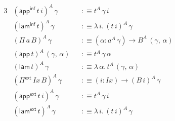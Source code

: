 \documentclass[12pt,a4paper,twoside,openany]{book}
\theoremstyle{remark}
\theoremstyle{definition}
\theoremstyle{theorem}
\newcommand{\mi}[1]{\mathit{#1}}
\newcommand{\ms}[1]{\mathsf{#1}}
\newcommand{\Pie}{\Pi^{\mathsf{ext}}}
\newcommand{\appe}{\mathsf{app^{ext}}}
\newcommand{\lame}{\mathsf{lam^{ext}}}
\newcommand{\appinf}{\mathsf{app^{inf}}}
\newcommand{\laminf}{\mathsf{lam^{inf}}}
\newcommand{\app}{\ms{app}}
\newcommand{\lam}{\ms{lam}}
\newcommand{\defn}{:\equiv}
\begin{document}
\begin{alignat*}{3}
  &(\appinf\,t\,i)^A\,\gamma &&\defn t^A\,\gamma\,i\\
  &(\laminf\,t)^A\,\gamma &&\defn \lambda\,i.\,(t\,i)^A\,\gamma\\
  &(\Pi\,a\,B)^A\,\gamma &&\defn (\alpha : a^A\,\gamma) \to B^A\,(\gamma,\,\alpha)\\
  &(\app\,t)^A\,(\gamma,\,\alpha) &&\defn t^A\,\gamma\,\alpha\\
  &(\lam\,t)^A\,\gamma &&\defn \lambda\,\alpha.\,t^A\,(\gamma,\,\alpha)\\
  &(\Pie\,\mi{Ix}\,B)^A\,\gamma &&\defn (i : \mi{Ix}) \to (B\,i)^A\,\gamma\\
  &(\appe\,t\,i)^A\,\gamma &&\defn t^A\,\gamma\,i\\
  &(\lame\,t)^A\,\gamma &&\defn \lambda\,i.\,(t\,i)^A\,\gamma
\end{alignat*}
\end{document}
